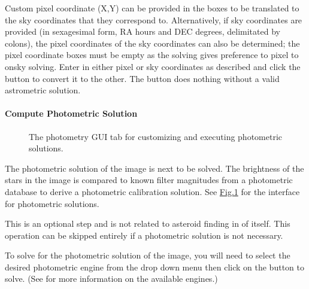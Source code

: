 \documentclass[letterpaper,11pt,english]{sphinxmanual}
\begin{document}
\sphinxAtStartPar
Custom pixel coordinate (X,Y) can be provided in the boxes to be translated to
the sky coordinates that they correspond to. Alternatively, if sky coordinates
are provided (in sexagesimal form, RA hours and DEC degrees, delimitated by
colons), the pixel coordinates of the sky coordinates can also be determined;
the pixel coordinate boxes must be empty as the solving gives preference to
pixel to on\sphinxhyphen{}sky solving. Enter in either pixel or sky coordinates as described
and click the  button to convert it to the other. The button
does nothing without a valid astrometric solution.


\paragraph{Compute Photometric Solution}
\label{\detokenize{user/manual_mode:compute-photometric-solution}}\label{\detokenize{user/manual_mode:user-manual-mode-procedure-find-asteroid-location-compute-photometric-solution}}
\begin{figure}[htbp]
\centering
\capstart

\noindent{}
\caption{The photometry GUI tab for customizing and executing photometric solutions.}\label{\detokenize{user/manual_mode:id6}}\label{\detokenize{user/manual_mode:figure-manual-mode-gui-photometry}}\end{figure}

\sphinxAtStartPar
The photometric solution of the image is next to be solved. The brightness of
the stars in the image is compared to known filter magnitudes from a
photometric database to derive a photometric calibration solution.
See \hyperref[\detokenize{user/manual_mode:figure-manual-mode-gui-photometry}]{Fig.\@ \ref{\detokenize{user/manual_mode:figure-manual-mode-gui-photometry}}} for the interface for photometric
solutions.

\sphinxAtStartPar
This is an optional step and is not related to asteroid finding in of itself.
This operation can be skipped entirely if a photometric solution is not
necessary.

\sphinxAtStartPar
To solve for the photometric solution of the image, you will need to select
the desired photometric engine from the drop down menu then click on the
 button to solve.
(See {\hyperref[\detokenize{technical/architecture/services_engines:technical-architecture-services-engines}]{}} for more information on
the available engines.)
\end{document}
